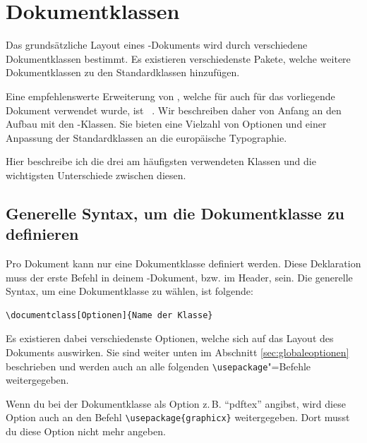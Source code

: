 %
%

\chapter{Dokumentklassen}
\label{sec:dokumentklassen}

Das grundsätzliche Layout eines \DMLLaTeX-Dokuments wird durch verschiedene Dokumentklassen bestimmt. Es existieren verschiedenste Pakete, welche weitere Dokumentklassen zu den Standardklassen hinzufügen.

Eine empfehlenswerte Erweiterung von \DMLLaTeX, welche für auch für das vorliegende Dokument verwendet wurde, ist \KOMAScript~\cite{KOMA}. Wir beschreiben daher von Anfang an den Aufbau mit den \KOMAScript-Klassen. Sie bieten eine Vielzahl von Optionen und einer Anpassung der Standardklassen an die europäische Typographie.

Hier beschreibe ich die drei am häufigsten verwendeten Klassen und die wichtigsten Unterschiede zwischen diesen.

\section{Generelle Syntax, um die Dokumentklasse zu definieren}

Pro Dokument kann nur eine Dokumentklasse definiert werden. Diese Deklaration muss der erste Befehl in deinem \DMLLaTeX-Dokument, bzw. im Header, sein. Die generelle Syntax, um eine Dokumentklasse zu wählen, ist folgende:

\begin{lstlisting}
\documentclass[Optionen]{Name der Klasse}
\end{lstlisting}

Es existieren dabei verschiedenste Optionen, welche sich auf das Layout des Dokuments auswirken. Sie sind weiter unten im Abschnitt \ref{sec:globaleoptionen} beschrieben und werden auch an alle folgenden \texttt{\textbackslash usepackage}"=Befehle weitergegeben. 

Wenn du bei der Dokumentklasse als Option z.\,B. \enquote{pdftex} angibst, wird diese Option auch an den Befehl \texttt{\textbackslash usepackage\{graphicx\}} weitergegeben. Dort musst du diese Option nicht mehr angeben.

